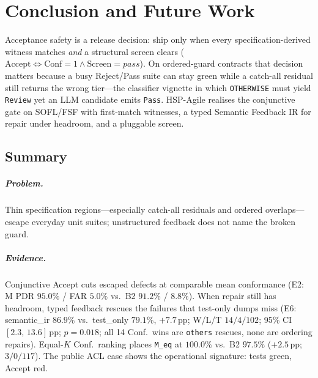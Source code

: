 
\chapter{Conclusion and Future Work}
\label{ch:conclusion}

Acceptance safety is a release decision: ship only when every
specification-derived witness matches \emph{and} a structural screen clears
($\mathrm{Accept}\Leftrightarrow\mathrm{Conf}{=}1\wedge\mathrm{Screen}{=}
\mathit{pass}$).
On ordered-guard contracts that decision matters because a busy Reject/Pass
suite can stay green while a catch-all residual still returns the wrong
tier---the classifier vignette in which \texttt{OTHERWISE} must yield
\texttt{Review} yet an LLM candidate emits \texttt{Pass}.
HSP-Agile realises the conjunctive gate on SOFL/FSF with first-match
witnesses, a typed Semantic Feedback IR for repair under headroom, and a
pluggable screen.


\section{Summary}
\label{sec:conc:summary}

\paragraph{Problem.}
Thin specification regions---especially catch-all residuals and ordered
overlaps---escape everyday unit suites; unstructured feedback does not name
the broken guard.

\paragraph{Evidence.}
Conjunctive Accept cuts escaped defects at comparable mean conformance
(E2: M PDR $95.0\%$ / FAR $5.0\%$ vs.\ B2 $91.2\%$ / $8.8\%$).
When repair still has headroom, typed feedback rescues the failures that
test-only dumps miss (E6: semantic\_ir $86.9\%$ vs.\ test\_only $79.1\%$,
${+}7.7$\,pp; W/L/T $14/4/102$; 95\% CI $[2.3,\,13.6]$\,pp; $p{=}0.018$;
all 14 Conf.\ wins are \texttt{others} rescues, none are ordering repairs).
Equal-$K$ Conf.\ ranking places \texttt{M\_eq} at $100.0\%$ vs.\ B2 $97.5\%$
(${+}2.5$\,pp; $3/0/117$).
The public ACL case shows the operational signature: tests green, Accept red.


